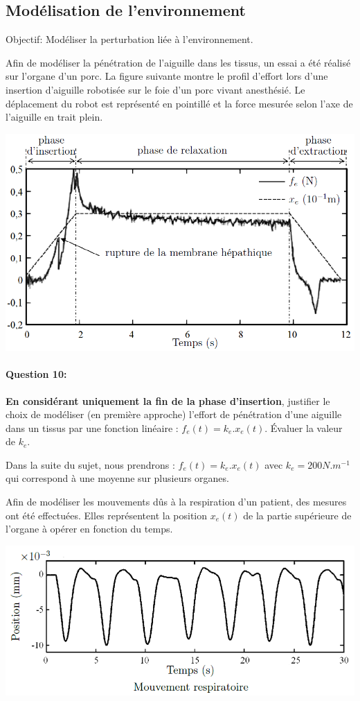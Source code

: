 \subsection{Modélisation de l'environnement}

Objectif: Modéliser la perturbation liée à l'environnement.

Afin de modéliser la pénétration de l'aiguille dans les tissus, un essai a été réalisé sur l'organe d'un porc. La figure suivante montre le profil d'effort lors d'une insertion d'aiguille robotisée sur le foie d'un porc vivant anesthésié. Le déplacement du robot est représenté en pointillé et la force mesurée selon l'axe de l'aiguille en trait plein.
 
\begin{center}
 \includegraphics[width=0.7\linewidth]{img/Figure13}
\end{center}

\paragraph{Question 10:} \textbf{En considérant uniquement la fin de la phase d'insertion}, justifier le choix de modéliser (en première approche) l'effort de pénétration d'une aiguille dans un tissus par une fonction linéaire : $f_e(t) = k_e.x_e(t)$. Évaluer la valeur de $k_e$.

Dans la suite du sujet, nous prendrons : $f_e(t)=k_e.x_e(t)$ avec $k_e=200N.m^{-1}$ qui correspond à une moyenne sur plusieurs organes.

Afin de modéliser les mouvements dûs à la respiration d'un patient, des mesures ont été effectuées. Elles représentent la position $x_e(t)$ de la partie supérieure de l'organe à opérer en fonction du temps.

\begin{center}
 \includegraphics[width=0.7\linewidth]{img/Figure14}
\end{center}

